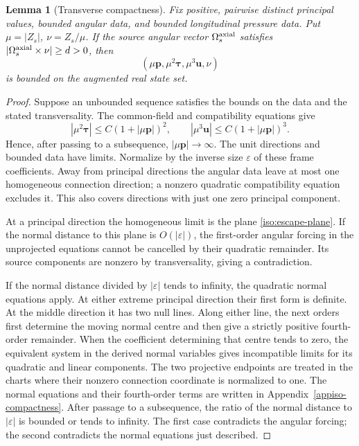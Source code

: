 \documentclass[11pt,a4paper]{article}
\numberwithin{equation}{section}
\theoremstyle{plain}
\newtheorem{lemma}[theorem]{Lemma}
\theoremstyle{definition}
\theoremstyle{remark}
\begin{document}
\begin{lemma}[Transverse compactness]\label{iso:compactness}
Fix positive, pairwise distinct principal values, bounded angular data,
and bounded longitudinal pressure data.  Put $\mu=|Z_s|$,
$\nu=Z_s/\mu$.  If the source angular vector $\Omega_s^{\rm axial}$ satisfies
$|\Omega_s^{\rm axial}\times\nu|\ge d>0$, then
\[
 (\mu\boldsymbol p,\mu^2\boldsymbol\tau,\mu^3\boldsymbol u,\nu)
\]
is bounded on the augmented real state set.  
\end{lemma}
\begin{proof}
Suppose an unbounded sequence satisfies the bounds on the data and the
stated transversality. The common-field and compatibility equations give
\begin{equation}\label{iso:compactness-jet-bounds}
 |\mu^2\boldsymbol\tau|\le C(1+|\mu\boldsymbol p|)^2,
 \qquad
 |\mu^3\boldsymbol u|\le C(1+|\mu\boldsymbol p|)^3.
\end{equation}
Hence, after passing to a subsequence, $|\mu\boldsymbol p|\to\infty$.
The unit directions and bounded data have limits. Normalize by
the inverse size $\varepsilon$ of these frame coefficients. Away from
principal directions the angular data leave at most one
homogeneous connection direction; a nonzero quadratic compatibility
equation excludes it. This also covers directions with just one zero
principal component.

At a principal direction the homogeneous limit is the plane
\eqref{iso:escape-plane}. If the normal distance to this plane is
$O(|\varepsilon|)$, the first-order angular forcing in the unprojected
equations cannot be cancelled by their quadratic remainder. Its source
components are nonzero by transversality, giving a contradiction.

If the normal distance divided by $|\varepsilon|$ tends to infinity,
the quadratic normal equations apply.
At either extreme principal direction their first form is definite.
At the middle direction it has two null lines. Along either line,
the next orders first determine the moving normal centre and then give
a strictly positive fourth-order remainder. When the coefficient
determining that centre tends to zero, the equivalent system in the
derived normal variables gives incompatible limits for its quadratic
and linear components. The two projective endpoints are treated in the charts where their
nonzero connection coordinate is normalized to one. The normal
equations and their fourth-order terms are written in
Appendix~\ref{appiso-compactness}. After passage to a subsequence, the
ratio of the normal distance to $|\varepsilon|$ is bounded or tends to
infinity. The first case contradicts the angular forcing; the second
contradicts the normal equations just described.
\end{proof}
\end{document}
